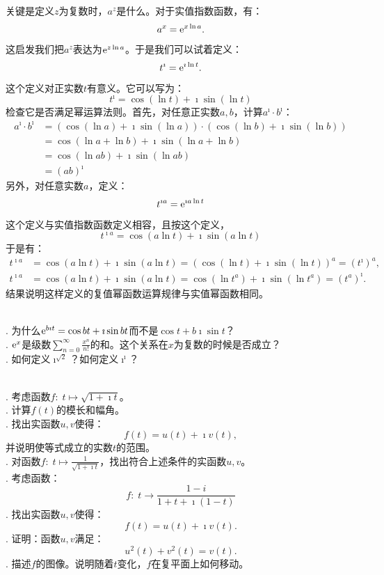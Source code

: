 \documentclass[12pt,UTF8]{ctexbook}
\begin{document}
\begin{so}
    关键是定义$z$为复数时，$a^{z}$是什么。对于实值指数函数，有：
    $$ a^{x} = \mathrm{e}^{x\ln{a}}. $$
    这启发我们把$a^{z}$表达为$\mathrm{e}^{z\ln{a}}$。于是我们可以试着定义：
    $$ t^{\imath} = \mathrm{e}^{\imath \ln{t}}. $$
    这个定义对正实数$t$有意义。它可以写为：
    $$ t^{\imath} = \cos{(\ln{t})} + \imath \sin{(\ln{t})} $$
    检查它是否满足幂运算法则。首先，对任意正实数$a,b$，计算$a^{\imath} \cdot b^{\imath}$：
    \begin{align*}
        a^{\imath} \cdot b^{\imath} &= (\cos{(\ln{a})} + \imath \sin{(\ln{a})}) \cdot (\cos{(\ln{b})} + \imath \sin{(\ln{b})}) \\
        &= \cos{(\ln{a} + \ln{b})} + \imath \sin{(\ln{a} + \ln{b})} \\
        &= \cos{(\ln{ab})} + \imath \sin{(\ln{ab})} \\
        &= (ab)^{\imath}
    \end{align*}
    另外，对任意实数$a$，定义：
    $$ t^{\imath a} = \mathrm{e}^{\imath a\ln{t}} $$
    这个定义与实值指数函数定义相容，且按这个定义，
    $$  t^{\imath a} = \cos{(a\ln{t})} + \imath \sin{(a\ln{t})} $$
    于是有：
    \begin{align*}
        t^{\imath a} &= \cos{(a\ln{t})} + \imath \sin{(a\ln{t})} = (\cos{(\ln{t})} + \imath \sin{(\ln{t})})^a = \left(t^\imath\right)^{a}, \\
        t^{\imath a} &= \cos{(a\ln{t})} + \imath \sin{(a\ln{t})} = \cos{(\ln{t^a})} + \imath \sin{(\ln{t^a})} = \left(t^a\right)^{\imath}.
    \end{align*}
    结果说明这样定义的复值幂函数运算规律与实值幂函数相同。
\end{so}

\begin{sk}
    \mbox{} \\
    . 为什么$\mathrm{e}^{b\imath t} = \cos{bt} + \imath \sin{bt}$而不是$\cos{t} + b\imath \sin{t}$？\\
    . $\mathrm{e}^x$是级数$\sum_{n=0}^{\infty} \frac{x^n}{n!}$的和。这个关系在$x$为复数的时候是否成立？\\
    . 如何定义$\imath^{\sqrt{2}}$？如何定义$\imath^{\imath}$？
\end{sk}

\begin{xt}
    \mbox{} \\
    . 考虑函数$f:\; t\mapsto \sqrt{1 + \imath t}$。\\
    . 计算$f(t)$的模长和幅角。\\
    . 找出实函数$u,v$使得：
    $$ f(t) = u(t) + \imath v(t), $$
    \indent 并说明使等式成立的实数$t$的范围。\\
    . 对函数$f:\;t\mapsto \frac{1}{\sqrt{1 + \imath t}}$，找出符合上述条件的实函数$u,v$。\\
    . 考虑函数：
    $$ f:\; t \to \frac{1 - i}{1 + t + \imath(1 - t)}$$
    . 找出实函数$u,v$使得：
    $$ f(t) = u(t) + \imath v(t). $$
    . 证明：函数$u,v$满足：
    $$ u^2(t) + v^2(t) = v(t).$$
    . 描述$f$的图像。说明随着$t$变化，$f$在复平面上如何移动。

\end{xt}
\end{document}
